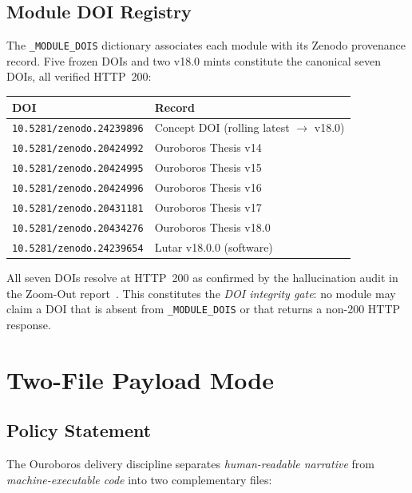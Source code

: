 \subsection{Module DOI Registry}
\label{ssec:module-doi}

The \texttt{\_MODULE\_DOIS} dictionary associates each module with its
Zenodo provenance record.  Five frozen DOIs and two v18.0 mints constitute
the canonical seven DOIs, all verified HTTP~200:

\begin{center}
\begin{tabular}{ll}
\textbf{DOI} & \textbf{Record} \\
\hline
\texttt{10.5281/zenodo.24239896} & Concept DOI (rolling latest $\to$ v18.0) \\
\texttt{10.5281/zenodo.20424992} & Ouroboros Thesis v14 \\
\texttt{10.5281/zenodo.20424995} & Ouroboros Thesis v15 \\
\texttt{10.5281/zenodo.20424996} & Ouroboros Thesis v16 \\
\texttt{10.5281/zenodo.20431181} & Ouroboros Thesis v17 \\
\texttt{10.5281/zenodo.20434276} & Ouroboros Thesis v18.0 \\
\texttt{10.5281/zenodo.24239654} & Lutar v18.0.0 (software) \\
\end{tabular}
\end{center}

All seven DOIs resolve at HTTP~200 as confirmed by the hallucination audit
in the Zoom-Out report~\cite{szl_zoom_out_v18}.  This constitutes the
\emph{DOI integrity gate}: no module may claim a DOI that is absent from
\texttt{\_MODULE\_DOIS} or that returns a non-200 HTTP response.

\section{Two-File Payload Mode}
\label{sec:two-file}

\subsection{Policy Statement}
\label{ssec:payload-policy}

The Ouroboros delivery discipline separates \emph{human-readable narrative}
from \emph{machine-executable code} into two complementary files:


